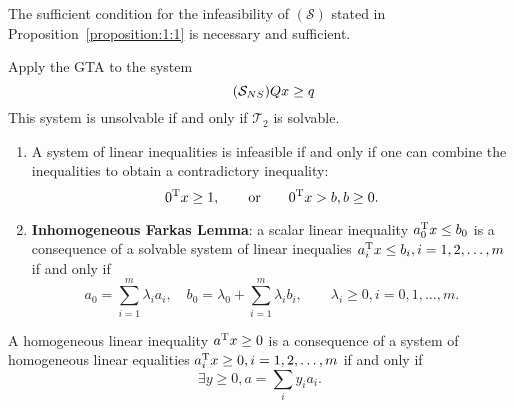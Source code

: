 \begin{theorem}
The sufficient condition for the infeasibility of $(\mathcal{S})$ stated in Proposition~\ref{proposition:1:1} is necessary and sufficient.
\end{theorem}

\begin{remark}
Apply the GTA to the system 
\begin{equation}
\tag{$\mathcal{S}_{NS}$}
Qx\ge q
\end{equation}
This system is unsolvable if and only if $\mathcal{T}_2$ is solvable.
\end{remark}

\begin{corollary}\label{corollary:1:3}
\begin{enumerate}
\item
A system of linear inequalities is infeasible if and only if one can combine the inequalities to obtain a contradictory inequality:
\[
0^{\mathrm T} x\ge1,\qquad\text{or}
\qquad
0^{\mathrm T} x>b, b\ge0.
\]
\item
\textbf{Inhomogeneous Farkas Lemma}:
a scalar linear inequality $a_0^{\mathrm T} x\le b_0$ is a consequence of a solvable system of linear inequalies $a_i^{\mathrm T} x\le b_i, i=1,2,\ldots,m$ if and only if 
\[
a_0=\sum_{i=1}^m\lambda_ia_i,\quad
b_0=\lambda_0+\sum_{i=1}^m\lambda_ib_i, \qquad\lambda_i\ge0, i=0,1,\ldots,m.
\]
\end{enumerate}
\end{corollary}

\begin{theorem}
A homogeneous linear inequality $a^{\mathrm T} x\ge0$ is a consequence of a system of homogeneous linear equalities $a_i^{\mathrm T} x\ge0, i=1,2,\ldots,m$ if and only if 
\[
\exists y\ge0, a=\sum_iy_ia_i.
\]
\end{theorem}




